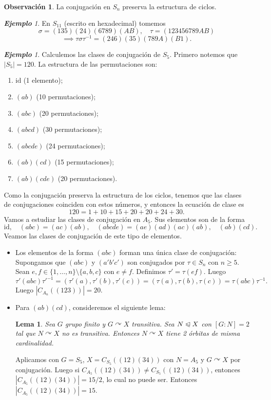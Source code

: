 \documentclass{article}
\newtheorem{lemma}[theorem]{Lema}
\theoremstyle{definition}
\newtheorem*{obs}{Observación}
\theoremstyle{remark}
\newtheorem{example}[theorem]{\textbf{Ejemplo}}
\numberwithin{equation}{section}
\newcommand{\acts}{\curvearrowright}
\newcommand{\normal}{\trianglelefteqslant}
\newcommand{\id}{\mathrm{id}}
\newcommand{\abs}[1]{\left| #1 \right|}
\begin{document}
\begin{obs}
  La conjugación en $S_n$ preserva la estructura de ciclos.
\end{obs}

\begin{example}
  En $S_{11}$ (escrito en hexadecimal) tomemos
  \[\sigma = (135)(24)(6789)(AB), \quad \tau = (123456789AB)\]
  \[\implies \tau\sigma\tau^{-1} = (246)(35)(789A)(B1).\]
\end{example}

\begin{example}
  Calculemos las clases de conjugación de $S_5$. Primero notemos que $\abs{S_5} = 120$. La estructura de las permutaciones son:
  \begin{enumerate}[(1)]
    \item $\id$ (1 elemento);
    \item $(ab)$ (10 permutaciones);
    \item $(abc)$ (20 permutaciones);
    \item $(abcd)$ (30 permutaciones);
    \item $(abcde)$ (24 permutaciones);
    \item $(ab)(cd)$ (15 permutaciones);
    \item $(ab)(cde)$ (20 permutaciones).
  \end{enumerate}
  Como la conjugación preserva la estructura de los ciclos, tenemos que las clases de conjugaciones coinciden con estos números, y entonces la ecuación de clase es
  \[120 = 1 + 10 + 15 + 20 + 20 + 24 + 30.\]
  Vamos a estudiar las clases de conjugación en $A_5$. Sus elementos son de la forma
  \[\id, \quad (abc) = (ac)(ab), \quad (abcde) = (ae)(ad)(ac)(ab), \quad (ab)(cd).\]
  Veamos las clases de conjugación de este tipo de elementos.
  \begin{itemize}
    \item Los elementos de la forma $(abc)$ forman una única clase de conjugación:
    Supongamos que $(abc)$ y $(a'b'c')$ son conjugados por $\tau \in S_n$ con $n \geq 5$. Sean $e,f \in \{1,\dots,n\} \setminus \{a,b,c\}$ con $e \neq f$. Definimos $\tau' = \tau(ef)$. Luego
    \[\tau'(abc)\tau'^{-1} = (\tau'(a), \tau'(b), \tau'(c))
    = (\tau(a),\tau(b),\tau(c)) = \tau(abc)\tau^{-1}.\]
    Luego $\abs{C_{A_n}((123))} = 20$.

    \item Para $(ab)(cd)$, consideremos el siguiente lema:
    \begin{lemma}
      Sea $G$ grupo finito y $G \acts X$ transitiva. Sea $N \normal X$ con $[G \colon N] = 2$ tal que $N \acts X$ no es transitiva.
      Entonces $N \acts X$ tiene 2 órbitas de misma cardinalidad.
    \end{lemma}
    Aplicamos con $G = S_5$, $X = C_{S_5}((12)(34))$ con $N = A_5$ y $G \acts X$ por conjugación.
    Luego si $C_{A_5}((12)(34)) \neq C_{S_5}((12)(34))$, entonces $\abs{C_{A_5}((12)(34))} = 15/2$, lo cual no puede ser. Entonces $\abs{C_{A_5}((12)(34))} = 15$.


\end{itemize}
\end{example}
\end{document}
